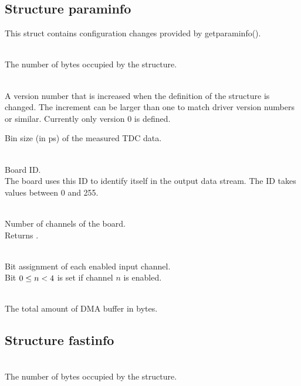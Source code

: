 
\subsection{Structure \prefix param\tu info}
This struct contains configuration changes provided by \textsf{\prefix get\tu param\tu info()}.

\\
The number of bytes occupied by the structure. \par

\\
A version number that is increased when the definition of the structure is changed. The increment can be larger than one to match driver version numbers or similar. Currently only version 0 is defined.\par


Bin size (in ps) of the measured TDC data.

\\
Board ID.\\
The board uses this ID to identify itself in the output data stream. The ID takes values between 0 and 255.\par

\\
Number of channels of the board.\\
Returns .\par

\\
Bit assignment of each enabled input channel.\\
Bit $0 \leq n < \ifxHPTDC{8}{4}$ is set if channel $n$ is enabled. \par

\\
The total amount of DMA buffer in bytes.


\subsection{Structure \prefix fast\tu info}

\\
The number of bytes occupied by the structure. \par

